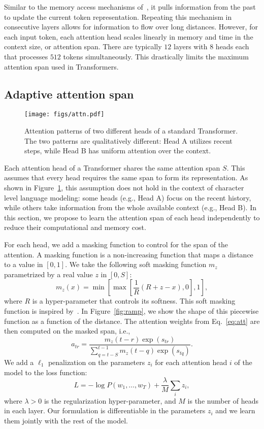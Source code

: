 \documentclass[11pt,a4paper]{article}
\newcommand{\fig}[1]{Figure~\ref{fig:#1}}
\newcommand{\eq}[1]{Eq.~\ref{eq:#1}}
\begin{document}
Similar to the memory access mechanisms of~\citet{sukhbaatar2015end}, it pulls information from the past to update the current token representation.
Repeating this mechanism in consecutive layers allows for information to flow over long distances.
However, for each input token, each attention head scales linearly in memory and time in the context size, or attention span.
There are typically $12$ layers with $8$ heads each that processes $512$ tokens simultaneously.
This drastically limits the maximum attention span used in Transformers.

\subsection{Adaptive attention span}
\label{sec:learned}

\begin{figure}[t]
\centering
\texttt{[image: figs/attn.pdf]}
\caption{Attention patterns of two different heads of a standard Transformer. The two patterns are qualitatively different: Head A utilizes recent steps, while Head B has uniform attention over the context.}
\label{fig:vanilla}
\end{figure}

Each attention head of a Transformer shares the same attention span $S$.
This assumes that every head requires the same span to form its representation.
As shown in Figure~\ref{fig:vanilla}, this assumption does not hold in the context of character level language modeling:
some heads (e.g., Head A) focus on the recent history, while others take information from the whole available context (e.g., Head B).
In this section, we propose to learn the attention span of each head independently to reduce their computational and memory cost.

For each head, we add a masking function to control for the span of the attention.
A masking function is a non-increasing function that maps a distance to a value in $[0,1]$.
We take the following soft masking function $m_z$ parametrized by a real value $z$ in $[0,S]$:
\begin{equation*}\label{eq:mask}
  m_z(x)=\min\left[\max\left[\frac{1}{R}\left(R+z-x\right), 0\right], 1\right],
\end{equation*}
where $R$ is a hyper-parameter that controls its softness.
This soft masking function is inspired by~\citet{jernite2016variable}.
In \fig{ramp}, we show the shape of this piecewise function as a function of the distance.
The attention weights from \eq{att} are then computed on the masked span, i.e.,
\[ a_{tr} =
  \frac{m_z(t-r)\exp\left( s_{tr} \right)}{\sum\limits_{q=t-S}^{t-1}m_z(t-q)\exp\left( s_{tq}\right)}.
\]
We add  a $\ell_1$ penalization on the parameters $z_i$ for each attention head $i$ of the model to the loss function:
\[L = -\log P(w_1,\dots,w_T) + \frac{\lambda}{M} \sum_{i} z_i,\]
where $\lambda>0$ is the regularization hyper-parameter, and $M$ is the number of heads in each layer.
Our formulation is differentiable in the parameters $z_i$ and we learn them jointly with the rest of the model.
\end{document}
